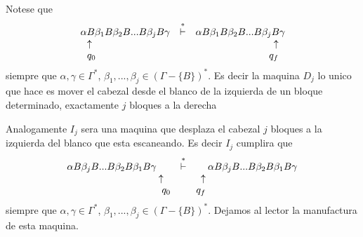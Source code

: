 \begin{frame}
  Notese que%
  \begin{equation*}
  \begin{array}{lcr}
  \alpha B\beta _{1}B\beta _{2}B...B\beta _{j}B\gamma  & \overset{\ast }{%
  \vdash } & \alpha B\beta _{1}B\beta _{2}B...B\beta _{j}B\gamma  \\
  \ \ \uparrow  &  & \uparrow \ \  \\
  \ \ q_{0} &  & q_{f}\ \
  \end{array}%
  \end{equation*}%
  siempre que $\alpha ,\gamma \in \Gamma ^{\ast }$, $\beta _{1},...,\beta
  _{j}\in (\Gamma -\{B\})^{\ast }$. Es decir la maquina $D_{j}$ lo unico que
  hace es mover el cabezal desde el blanco de la izquierda de un bloque
  determinado, exactamente $j$ bloques a la derecha

  Analogamente $I_{j}$ sera una maquina que desplaza el cabezal $j$ bloques a
  la izquierda del blanco que esta escaneando. Es decir $I_{j}$ cumplira que%
  \begin{equation*}
  \begin{array}{lcr}
  \alpha B\beta _{j}B...B\beta _{2}B\beta _{1}B\gamma  & \overset{\ast }{%
  \vdash } & \alpha B\beta _{j}B...B\beta _{2}B\beta _{1}B\gamma  \\
  \ \ \ \ \ \ \ \ \ \ \ \ \ \ \ \ \ \ \ \ \ \ \ \ \ \ \ \ \uparrow  &  &
  \uparrow \ \ \ \ \ \ \ \ \ \ \ \ \ \ \ \ \ \ \ \ \ \ \ \ \ \ \ \  \\
  \ \ \ \ \ \ \ \ \ \ \ \ \ \ \ \ \ \ \ \ \ \ \ \ \ \ \ \ \ q_{0} &  & q_{f}\
  \ \ \ \ \ \ \ \ \ \ \ \ \ \ \ \ \ \ \ \ \ \ \ \ \ \ \
  \end{array}%
  \end{equation*}%
  siempre que $\alpha ,\gamma \in \Gamma ^{\ast }$, $\beta _{1},...,\beta
  _{j}\in (\Gamma -\{B\})^{\ast }$. Dejamos al lector la manufactura de esta
  maquina.
\end{frame}
